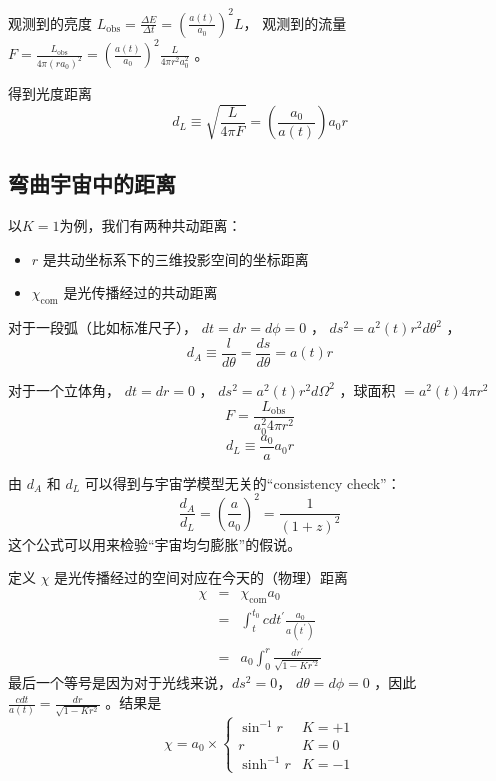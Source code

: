 \documentclass[12pt]{ctexart}
\begin{document}
观测到的亮度 $L_\text{obs}=\frac{\Delta E}{\Delta t}=\left(\frac{a(t)}{a_0}\right)^2 L$，
观测到的流量 $F=\frac{L_\text{obs}}{4\pi (ra_0)^2}=\left(\frac{a(t)}{a_0}\right)^2 \frac{L}{4\pi r^2 a_0^2}$ 。

得到光度距离
\begin{equation}
    d_L\equiv\sqrt{\frac{L}{4\pi F}}= \left(\frac{a_0}{a(t)}\right)a_0 r
\end{equation} 

\subsection{弯曲宇宙中的距离}

以$K=1$为例，我们有两种共动距离：
\begin{itemize}
    \item $r$ 是共动坐标系下的三维投影空间的坐标距离
    \item $\chi_\text{com}$ 是光传播经过的共动距离
\end{itemize}

对于一段弧（比如标准尺子）， $dt=dr=d\phi = 0$ ， $ds^2=a^2(t)r^2d\theta^2$ ，
\begin{equation}
    d_A\equiv \frac{l}{d\theta} = \frac{ds}{d\theta} = a(t)r
\end{equation}

对于一个立体角， $dt=dr=0$ ， $ds^2=a^2(t)r^2d\Omega^2$ ，球面积 $=a^2(t) 4\pi r^2$ 
\begin{equation}
    F = \frac{L_\text{obs}}{a_0^2 4\pi r^2}
\end{equation}
\begin{equation}
    d_L\equiv \frac{a_0}{a}a_0 r
\end{equation}

由 $d_A$ 和 $d_L$ 可以得到与宇宙学模型无关的“consistency check”：
\begin{equation}
    \frac{d_A}{d_L} = \left(\frac{a}{a_0}\right)^2 = \frac{1}{(1+z)^2}
\end{equation}  
这个公式可以用来检验“宇宙均匀膨胀”的假说。

定义 $\chi$ 是光传播经过的空间对应在今天的（物理）距离
\begin{eqnarray}
    \chi &=& \chi_\text{com} a_0 \\
        &=& \int_t^{t_0} c dt^\prime \frac{a_0}{a(t^\prime)} \label{eq:chidefine} \\ 
        &=& a_0 \int_0^r \frac{dr^\prime}{\sqrt{1-Kr^{\prime 2}}}
\end{eqnarray}
最后一个等号是因为对于光线来说，$ds^2=0$， $d\theta=d\phi = 0$ ，因此 $\frac{c dt}{a(t)}=\frac{dr}{\sqrt{1-Kr^2}}$ 。结果是
\begin{equation}
    \chi = a_0 \times
    \begin{cases}
        \sin^{-1} r & K=+1 \\ 
        r & K=0 \\ 
        \sinh^{-1} r & K=-1
    \end{cases}
\end{equation}
\end{document}
